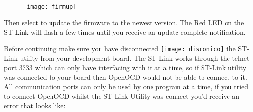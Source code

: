 \begin{figure}[htbp]
\centering
\texttt{[image: firmup]}
\end{figure}
\par
Then select  to update the firmware to the newest version. The Red LED on the ST-Link will flash a few times until you receive an update complete notification. 
\\
\par
\raggedright
Before continuing make sure you have disconnected \texttt{[image: disconico]} the ST-Link utility from your development board.  The ST-Link works through the telnet port 3333 which can only have \underline{} interfacing with it at a time, so if ST-Link utility was connected to your board then OpenOCD would not be able to connect to it. All communication ports can only be used by one program at a time, if you tried to connect OpenOCD whilst the ST-Link Utility was connect you'd receive an error that looks like:
\\
\centering
